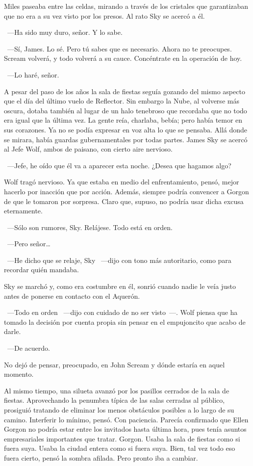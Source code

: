 Miles paseaba entre las celdas, mirando a través de los cristales que garantizaban que no era a su vez visto por los presos. Al rato Sky se acercó a él.

~---Ha sido muy duro, señor. Y lo sabe.

~---Sí, James. Lo sé. Pero tú sabes que es necesario. Ahora no te preocupes. Scream volverá, y todo volverá a su cauce. Concéntrate en la operación de hoy.

~---Lo haré, señor.

\parbreak
A pesar del paso de los años la sala de fiestas seguía gozando del mismo aspecto que el día del último vuelo de Reflector. Sin embargo la Nube, al volverse más oscura, dotaba también al lugar de un halo tenebroso que recordaba que no todo era igual que la última vez. La gente reía, charlaba, bebía; pero había temor en sus corazones. Ya no se podía expresar en voz alta lo que se pensaba. Allá donde se mirara, había guardas gubernamentales por todas partes. James Sky se acercó al Jefe Wolf, ambos de paisano, con cierto aire nervioso.

~---Jefe, he oído que él va a aparecer esta noche. ¿Desea que hagamos algo?

Wolf tragó nervioso. Ya que estaba en medio del enfrentamiento, pensó, mejor hacerlo por inacción que por acción. Además, siempre podría convencer a Gorgon de que le tomaron por sorpresa. Claro que, supuso, no podría usar dicha excusa eternamente.

~---Sólo son rumores, Sky. Relájese. Todo está en orden.

~---Pero señor\dots

~---He dicho que se relaje, Sky ~---dijo con tono más autoritario, como para recordar quién mandaba.

Sky se marchó y, como era costumbre en él, sonrió cuando nadie le veía justo antes de ponerse en contacto con el Aquerón.

~---Todo en orden ~---dijo con cuidado de no ser visto~---. Wolf piensa que ha tomado la decisión por cuenta propia sin pensar en el empujoncito que acabo de darle.

~---De acuerdo.

No dejó de pensar, preocupado, en John Scream y dónde estaría en aquel momento.

Al mismo tiempo, una silueta avanzó por los pasillos cerrados de la sala de fiestas. Aprovechando la penumbra típica de las salas cerradas al público, prosiguió tratando de eliminar los menos obstáculos posibles a lo largo de su camino. Interferir lo mínimo, pensó. Con paciencia. Parecía confirmado que Ellen Gorgon no podría estar entre los invitados hasta última hora, pues tenía asuntos empresariales importantes que tratar. Gorgon. Usaba la sala de fiestas como si fuera suya. Usaba la ciudad entera como si fuera suya. Bien, tal vez todo eso fuera cierto, pensó la sombra afilada. Pero pronto iba a cambiar.

